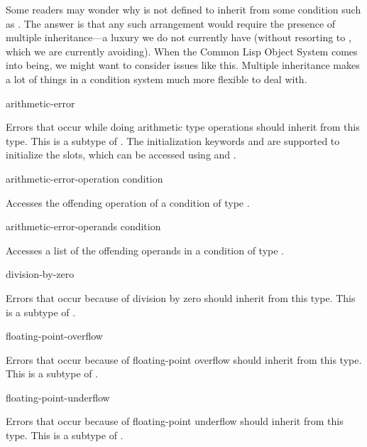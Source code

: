 \beforenoterule
\begin{sideremark}

    Some readers may wonder why  is not defined to inherit
    from some condition such as . The answer is that any such
    arrangement would require the presence of multiple inheritance---a 
    luxury we do not currently have (without resorting to , which 
    we are currently avoiding). When the Common Lisp Object System comes
    into being, we might want to consider issues like this. 
    Multiple inheritance makes a lot of things in a condition system much
    more flexible to deal with.

   
\end{sideremark}
\afternoterule

\begin{defun}[Type]
arithmetic-error

  Errors that occur while doing arithmetic type operations should inherit
  from this type. This is a subtype of . The initialization keywords 
  and  are supported to initialize the slots, which can be accessed
  using  and .
\end{defun}

\begin{defun}[Function]
arithmetic-error-operation condition

  Accesses the offending operation of a condition of type .
\end{defun}

\begin{defun}[Function]
arithmetic-error-operands condition

  Accesses a list of the offending operands in a condition of type 
  .
\end{defun}

\begin{defun}[Type]
division-by-zero

  Errors that occur because of division by zero should inherit from this type.
  This is a subtype of .
\end{defun}

\begin{defun}[Type]
floating-point-overflow

  Errors that occur because of floating-point overflow should inherit from
  this type. This is a subtype of .
\end{defun}

\begin{defun}[Type]
floating-point-underflow

  Errors that occur because of floating-point underflow should inherit from
  this type. This is a subtype of .
\end{defun}


